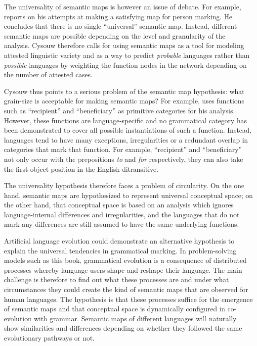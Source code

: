 The universality of semantic maps is however an issue of debate. For example, \citet{cysouw08building} reports on his attempts at making a satisfying map for person marking. He concludes that there is no single ``universal'' semantic map. Instead, different semantic maps are possible depending on the level and granularity of the analysis. Cysouw therefore calls for using semantic maps as a tool for modeling attested linguistic variety and as a way to predict {\em probable} languages rather than {\em possible} languages by weighting the function nodes in the network depending on the number of attested cases.

Cysouw thus points to a serious problem of the semantic map hypothesis: what grain-size is acceptable for making semantic maps? For example, \citet{haspelmath03geometry} uses functions such as ``recipient'' and ``beneficiary'' as primitive categories for his analysis. However, these functions are language-specific and no grammatical category has been demonstrated to cover all possible instantiations of such a function. Instead, languages tend to have many exceptions, irregularities or a redundant overlap in categories that mark that function. For example, ``recipient'' and ``beneficiary'' not only occur with the prepositions {\em to} and {\em for} respectively, they can also take the first object position in the English ditransitive.

The universality hypothesis therefore faces a problem of circularity. On the one hand, semantic maps are hypothesized to represent universal conceptual space; on the other hand, that conceptual space is based on an analysis which ignores language-internal differences and irregularities, and the languages that do not mark any differences are still assumed to have the same underlying functions.

Artificial language evolution could demonstrate an alternative hypothesis to explain the universal tendencies in grammatical marking. In problem-solving models such as this book, grammatical evolution is a consequence of distributed processes whereby language users shape and reshape their language. The main challenge is therefore to find out what these processes are and under what circumstances they could create the kind of semantic maps that are observed for human languages. The hypothesis is that these processes suffice for the emergence of semantic maps and that conceptual space is dynamically configured in co-evolution with grammar. Semantic maps of different languages will naturally show similarities and differences depending on whether they followed the same evolutionary pathways or not.


